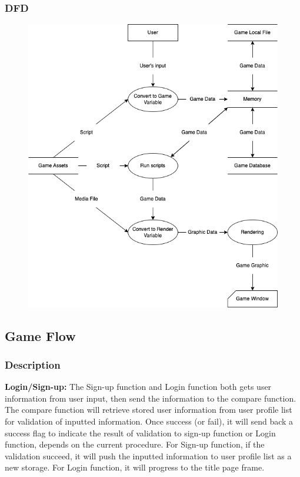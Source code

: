 \documentclass[11pt]{article}
\begin{document}
\subsubsection{DFD}
\begin{figure}[H]
    \centering
    \includegraphics*[scale=0.4]{Master_DFD.png}
\end{figure}
\subsection{Game Flow}
\subsubsection{Description}
\textbf{Login/Sign-up:} The Sign-up function and Login function both gets user information from user input, then send the information to the compare function. The compare function will retrieve stored user information from user profile list for validation of inputted information. Once success (or fail), it will send back a success flag to indicate the result of validation to sign-up function or Login function, depends on the current procedure. For Sign-up function, if the validation succeed, it will push the inputted information to user profile list as a new storage. For Login function, it will progress to the title page frame.
\end{document}
